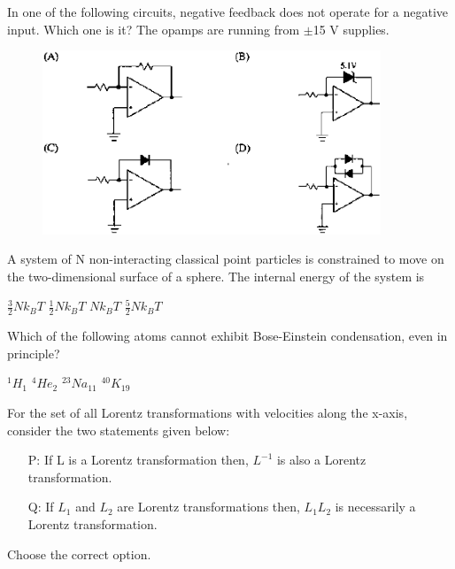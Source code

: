 \documentclass{exam}
\begin{document}
\begin{questions}
\question In one of the following circuits, negative feedback does not operate for a negative input. Which one is it? The opamps are running from $\pm$15 V supplies.\hfill{}
\begin{figure}[H]
	\centering
	\includegraphics[width=0.9\textwidth]{pics/20.png}
\end{figure}

\question A system of N non-interacting classical point particles is constrained to move on the two-dimensional surface of a sphere. The internal energy of the system is\hfill{}

\begin{oneparchoices}
	\choice $\frac{3}{2}Nk_{B}T$ \choice $\frac{1}{2}Nk_{B}T$ \choice $Nk_{B}T$ \choice $\frac{5}{2}Nk_{B}T$
\end{oneparchoices}

\question Which of the following atoms cannot exhibit Bose-Einstein condensation, even in principle?\hfill{}

\begin{oneparchoices}
	\choice $^{1}H_{1}$ \choice $^{4}He_{2}$ \choice $^{23}Na_{11}$ \choice $^{40}K_{19}$
\end{oneparchoices}

\question For the set of all Lorentz transformations with velocities along the x-axis, consider the two statements given below:
	\begin{itemize}
		\item[P:] If L is a Lorentz transformation then, $L^{-1}$ is also a Lorentz transformation.
		\item[Q:] If $L_1$ and $L_2$ are Lorentz transformations then, $L_1L_2$ is necessarily a Lorentz transformation.
	\end{itemize}
	Choose the correct option.\hfill{}


\end{questions}
\end{document}
